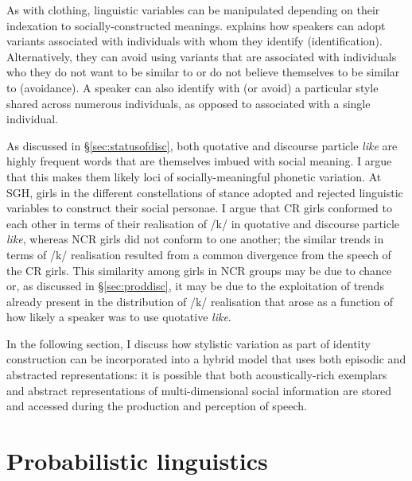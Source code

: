 As with clothing, linguistic variables can be manipulated depending on their indexation to socially-constructed meanings.   \citet{zwicky1997} explains how spea\-kers can adopt variants associated with individuals with whom they identify (identification).  Alternatively, they can avoid using variants that are associated with individuals who they do not want to be similar to or do not believe themselves to be similar to (avoidance).  A speaker can also identify with (or avoid) a particular style shared across numerous individuals, as opposed to associated with a single individual.

As discussed in \S \ref{sec:statusofdisc}, both quotative and discourse particle \textit{like} are highly frequent words that are themselves imbued with social meaning.  I argue that this makes them likely loci of socially-meaningful phonetic variation.  At SGH, girls in the different constellations of stance adopted and rejected linguistic variables to construct their social personae.  I argue that CR girls conformed to each other in terms of their realisation of /k/ in quotative and discourse particle \textit{like}, whereas NCR girls did not conform to one another; the similar trends in terms of /k/ realisation resulted from a common divergence from the speech of the CR girls.  This similarity among girls in NCR groups may be due to chance or, as discussed in \S \ref{sec:proddisc}, it may be due to the exploitation of trends already present in the distribution of /k/ realisation that arose as a function of how likely a speaker was to use quotative \textit{like}.  

In the following section, I discuss how stylistic variation as part of identity construction can be incorporated into a hybrid model that uses both episodic and abstracted representations:  it is possible that both acoustically-rich exemplars and abstract representations of multi-dimensional social information are stored and accessed during the production and perception of speech.

\section{Probabilistic linguistics}

